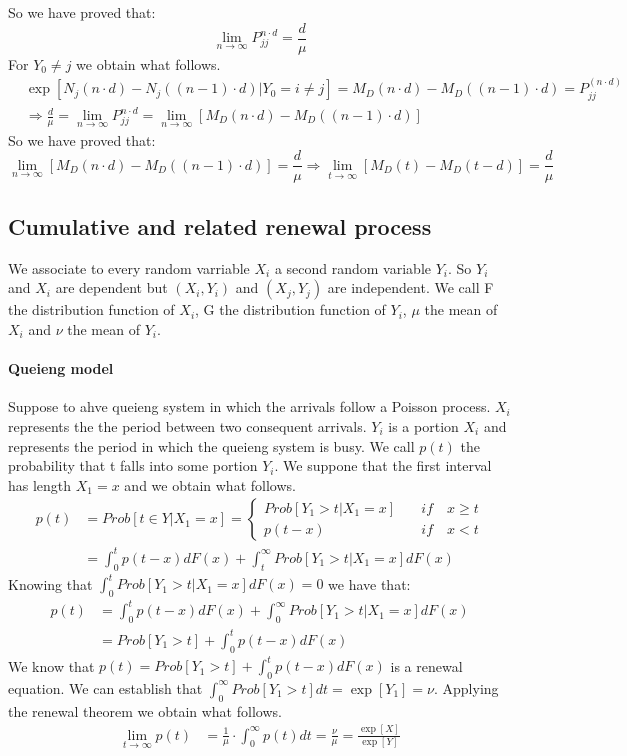 So we have proved that:
\begin{equation}
	\lim_{n \to \infty} P_{jj}^{n \cdot d}=\frac{d}{\mu}
\end{equation}
For $Y_0 \neq j$ we obtain what follows.
\begin{align*}
	& \exp[N_j(n \cdot d)-N_j((n-1) \cdot d)|Y_0=i \neq j]=M_D(n \cdot d)-M_D((n-1) \cdot d)=P_{jj}^{(n \cdot d)}
	\\ & \Rightarrow \frac{d}{\mu}=\lim_{n \to \infty} P_{jj}^{n \cdot d} = \lim_{n \to \infty} [M_D(n \cdot d)-M_D((n-1) \cdot d)]
\end{align*}
So we have proved that:
\begin{equation}
	\lim_{n \to \infty} [M_D(n \cdot d)-M_D((n-1) \cdot d)]=\frac{d}{\mu} \Rightarrow \lim_{t \to \infty }[M_D(t)-M_D(t-d)]=\frac{d}{\mu}
\end{equation}

\subsection{Cumulative and related renewal process}
We associate to every random varriable $X_i$ a second random variable $Y_i$. So $Y_i$ and $X_i$ are dependent but $(X_i,Y_i)$ and $(X_j,Y_j)$ are independent. We call F the distribution function of $X_i$, G the distribution function of $Y_i$, $\mu$ the mean of $X_i$ and $\nu$ the mean of $Y_i$.
\paragraph{Queieng model}
Suppose to ahve queieng system in which the arrivals follow a Poisson process. $X_i$ represents the the period between two consequent arrivals. $Y_i$ is a portion $X_i$ and represents the period in which the queieng system is busy. We call $p(t)$ the probability that t falls into some portion $Y_i$. We suppone that the first interval has length $X_1=x$ and we obtain what follows.
\begin{align*}
	p(t) & =Prob[t \in Y |X_1 = x]=\begin{cases}
		Prob[Y_1>t|X_1=x] \quad & if \quad x \geq t
		\\ p(t-x) \quad & if \quad x<t
	\end{cases}
	\\ & = \int_0^t p(t-x)dF(x)+\int_t^{\infty}Prob[Y_1>t|X_1=x]dF(x)
\end{align*}
Knowing that $\int_0^{t}Prob[Y_1>t|X_1=x]dF(x)=0$ we have that:
\begin{align*}
	p(t) & = \int_0^t p(t-x)dF(x)+\int_0^{\infty}Prob[Y_1>t|X_1=x]dF(x)
	\\ & = Prob[Y_1>t]+\int_0^t p(t-x)dF(x)
\end{align*}
We know that $p(t)= Prob[Y_1>t]+\int_0^t p(t-x)dF(x)$ is a renewal equation. We can establish that $\int_0^{\infty}Prob[Y_1>t]dt=\exp[Y_1]=\nu$. Applying the renewal theorem we obtain what follows.
\begin{align*}
	\lim_{t \to \infty} p(t) & = \frac{1}{\mu}\cdot\int_0^{\infty}p(t)dt = \frac{\nu}{\mu}= \frac{\exp[X]}{\exp[Y]}
\end{align*}




